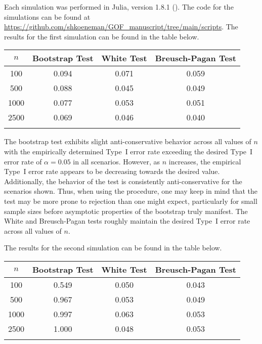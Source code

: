 \documentclass[12pt]{article} %
\theoremstyle{definition}
\begin{document}
Each simulation was performed in Julia, version 1.8.1 (\cite{Bezanson}). The code for the simulations can be found at \url{https://github.com/shkoeneman/GOF_manuscript/tree/main/scripts}. The results for the first simulation
can be found in the table below.

\begin{table}[H]
	\centering
	\small\addtolength{\tabcolsep}{-3pt}
	\setlength\extrarowheight{-3pt}
	{
	\begin{tabular}{ c|c|c|c}
	$n$ & Bootstrap Test & White Test & Breusch-Pagan Test \\
	 \hline
	 100 & 0.094 & 0.071 & 0.059 \\
	 500 & 0.088 & 0.045 & 0.049 \\
	 1000 & 0.077 & 0.053 & 0.051 \\
	 2500 & 0.069 & 0.046 & 0.040 \\
	 \Xhline{3\arrayrulewidth}
	\end{tabular}
	}
\end{table}

The bootstrap test exhibits slight anti-conservative behavior across all values of $n$ with the empirically determined Type~I error rate exceeding the desired Type~I error rate
of $\alpha = 0.05$ in all scenarios. However, as $n$ increases, the empirical Type~I error rate appears to be decreasing towards the desired value. Additionally, the
behavior of the test is consistently anti-conservative for the scenarios shown. Thus, when using the procedure, one may keep in mind that the test may be more prone to
rejection than one might expect, particularly for small sample sizes before asymptotic properties of the bootstrap truly manifest. The White and Breusch-Pagan tests roughly maintain
the desired Type~I error rate across all values of $n$.

The results for the second simulation can be found in the table below.

\begin{table}[H]
	\centering
	\small\addtolength{\tabcolsep}{-3pt}
	\setlength\extrarowheight{-3pt}
	{
	\begin{tabular}{ c|c|c|c}
	$n$ & Bootstrap Test & White Test & Breusch-Pagan Test \\
	 \hline
	 100 & 0.549 & 0.050 & 0.043 \\
	 500 & 0.967 & 0.053 & 0.049 \\
	 1000 & 0.997 & 0.063 & 0.053 \\
	 2500 & 1.000 & 0.048 & 0.053 \\
	 \Xhline{3\arrayrulewidth}
	\end{tabular}
	}
\end{table}
\end{document}
